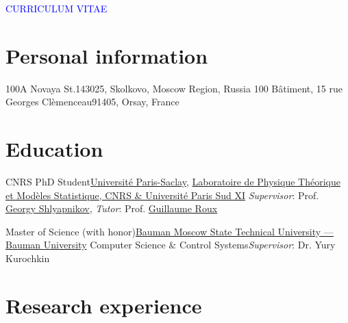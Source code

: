 \documentclass[10pt,a4paper,sans]{moderncv}
\begin{document}
\begin{center}
\Large
\textcolor{blue}{CURRICULUM VITAE}
\end{center}

\section{Personal information}

	{}{100A Novaya St.}{143025, Skolkovo, Moscow Region, Russia}{}
	{}{100 B\^atiment, 15 rue Georges Cl{\`e}menceau}{91405, Orsay, France}{}

\section{Education}

	{CNRS PhD Student}{{\textcolor{blue}{\href{https://www.universite-paris-saclay.fr/en/}{Universit{\' e} Paris-Saclay}}},
	\textcolor{blue}{\href{http://lptms.u-psud.fr/en}{Laboratoire de Physique Th{\'e}orique et Mod{\`e}les Statistique, CNRS \& Universit{\' e} Paris Sud XI}}}
	{\textit{Supervisor}: Prof. \textcolor{blue}{\href{http://staff.science.uva.nl/~walraven/shlyapnikov/GoraShlyapnikov-french.htm}{Georgy Shlyapnikov}},
	{\textit{Tutor}: Prof. \textcolor{blue}{\href{http://lptms.u-psud.fr/membres/groux/}{Guillaume Roux}}}}{}{}{}{}

	{Master of Science (with honor)}{\textcolor{blue}{\href{http://bmstu.ru}{Bauman Moscow State Technical University --- Bauman University}}}
	{\newline Computer Science \& Control Systems}{\textit{Supervisor}: Dr. Yury Kurochkin}{}{}

\section{Research experience}

\end{document}

